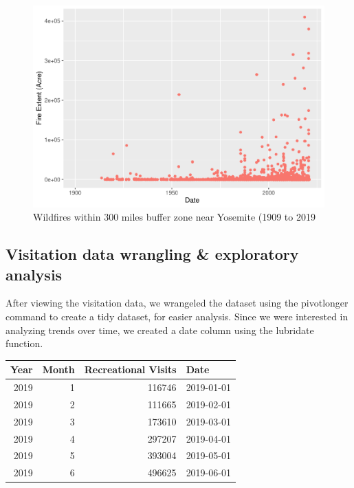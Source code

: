 \documentclass[
  12pt,
]{article}
\begin{document}
\begin{figure}
\centering
\includegraphics{CodeFinal_files/figure-latex/FireExp1-1.pdf}
\caption{\label{fig:FireExp1}Wildfires within 300 miles buffer zone near Yosemite (1909 to 2019}
\end{figure}

\newpage

\hypertarget{visitation-data-wrangling-exploratory-analysis}{%
\subsection{Visitation data wrangling \& exploratory analysis}\label{visitation-data-wrangling-exploratory-analysis}}

After viewing the visitation data, we wrangeled the dataset using the pivotlonger command to create a tidy dataset, for easier analysis. Since we were interested in analyzing trends over time, we created a date column using the lubridate function.

\begin{tabular}{r|r|r|l}
\hline
Year & Month & Recreational Visits & Date\\
\hline
2019 & 1 & 116746 & 2019-01-01\\
\hline
2019 & 2 & 111665 & 2019-02-01\\
\hline
2019 & 3 & 173610 & 2019-03-01\\
\hline
2019 & 4 & 297207 & 2019-04-01\\
\hline
2019 & 5 & 393004 & 2019-05-01\\
\hline
2019 & 6 & 496625 & 2019-06-01\\
\hline
\end{tabular}
\end{document}
